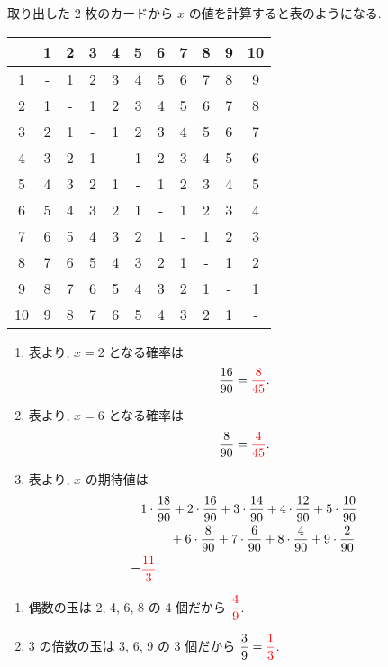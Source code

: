 取り出した 2 枚のカードから $x$ の値を計算すると表のようになる.
\begin{table}[H]
	\centering
	\begin{tabular}{c|cccccccccc}
		   & 1 & 2 & 3 & 4 & 5 & 6 & 7 & 8 & 9 & 10 \\ \hline
		 1 & - & 1 & 2 & 3 & 4 & 5 & 6 & 7 & 8 &  9 \\
		 2 & 1 & - & 1 & 2 & 3 & 4 & 5 & 6 & 7 &  8 \\
		 3 & 2 & 1 & - & 1 & 2 & 3 & 4 & 5 & 6 &  7 \\
		 4 & 3 & 2 & 1 & - & 1 & 2 & 3 & 4 & 5 &  6 \\
		 5 & 4 & 3 & 2 & 1 & - & 1 & 2 & 3 & 4 &  5 \\
		 6 & 5 & 4 & 3 & 2 & 1 & - & 1 & 2 & 3 &  4 \\
		 7 & 6 & 5 & 4 & 3 & 2 & 1 & - & 1 & 2 &  3 \\
		 8 & 7 & 6 & 5 & 4 & 3 & 2 & 1 & - & 1 &  2 \\
		 9 & 8 & 7 & 6 & 5 & 4 & 3 & 2 & 1 & - &  1 \\
		10 & 9 & 8 & 7 & 6 & 5 & 4 & 3 & 2 & 1 &  - \\
	\end{tabular}
\end{table}
\begin{enumerate}
	\item{
		表より, $x = 2$ となる確率は
		\begin{align}
			\frac{16}{90} = \textcolor{red}{\frac{8}{45}}.
		\end{align}
	}
	\item{
		表より, $x = 6$ となる確率は
		\begin{align}
			\frac{8}{90} = \textcolor{red}{\frac{4}{45}}.
		\end{align}
	}
	\item{
		表より, $x$ の期待値は
		\begin{align}
			&1\cdot\frac{18}{90} + 2\cdot\frac{16}{90} + 3\cdot\frac{14}{90} + 4\cdot\frac{12}{90} + 5\cdot\frac{10}{90} \\
				&\textbf{\quad\quad} + 6\cdot\frac{8}{90} + 7\cdot\frac{6}{90} + 8\cdot\frac{4}{90} + 9\cdot\frac{2}{90} \\
				=& \textcolor{red}{\frac{11}{3}}.
		\end{align}
	}
\end{enumerate}

\vspace{\baselineskip}
\check

\begin{enumerate}
	\item{
		偶数の玉は 2, 4, 6, 8 の 4 個だから $\textcolor{red}{\dfrac{4}{9}}$.
	}
	\item{
		3 の倍数の玉は 3, 6, 9 の 3 個だから $\dfrac{3}{9} = \textcolor{red}{\dfrac{1}{3}}$.
	}
\end{enumerate}

